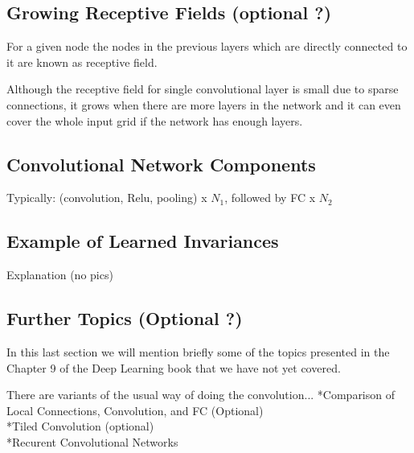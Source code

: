 \documentclass[]{article}
\begin{document}
\subsection{Growing Receptive Fields (optional ?)}
For a given node the nodes in the previous layers which are directly connected
to it are known as receptive field.

Although the receptive field for single convolutional layer is small due to sparse
connections, it grows when there are more layers in the network and it can even
cover the whole input grid if the network has enough layers.

\subsection{Convolutional Network Components}
Typically: (convolution, Relu, pooling) x $N_1$, followed by FC x $N_2$


\subsection{Example of Learned Invariances}
Explanation (no pics)

%

\subsection{Further Topics (Optional ?)}
In this last section we will mention briefly some of the topics presented in the
Chapter 9 of the Deep Learning book that we have not yet covered.

There are variants of the usual way of doing the convolution...
\newline
*Comparison of Local Connections, Convolution, and FC (Optional)\\
*Tiled Convolution (optional)\\
*Recurent Convolutional Networks
\end{document}
